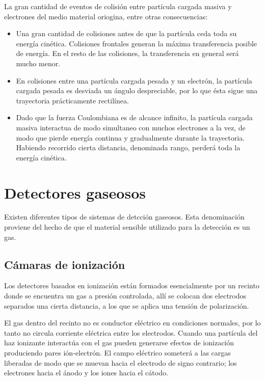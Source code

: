 %
La gran cantidad de eventos de colisi\'on entre part\'icula cargada masiva y electrones del medio material oriogina, entre otras 
consecuencias:

\begin{itemize}
 \item Una gran cantidad de colisiones antes de que la part\'icula ceda toda su energ\'ia cin\'etica. Colisiones frontales generan la 
 m\'axima transferencia posible de energ\'ia. En el resto de las colisiones, la transferencia en general ser\'a mucho menor.
 \item En colisiones entre una part\'icula cargada pesada y un electr\'on, la part\'icula cargada pesada es desviada un \'angulo 
 despreciable, por lo que \'esta sigue una trayectoria pr\'acticamente rectil\'inea.
 \item Dado que la fuerza Coulombiana es de alcance infinito, la part\'icula cargada masiva interactua de modo simultaneo con muchos 
 electrones a la vez, de modo que pierde energ\'ia continua y gradualmente durante la trayectoria. Habiendo recorrido cierta distancia, 
 denominada rango, perder\'a toda la energ\'ia cin\'etica.
\end{itemize}

\section{Detectores gaseosos}
\label{CapIII_5}


Existen diferentes tipos de sistemas de detcci\'on gaseosos. Esta denominaci\'on proviene del hecho de que el material sensible utilizado 
para la detecci\'on es un gas.


\subsection{C\'amaras de ionizaci\'on}
\label{CapIII_6}

Los detectores basados en ionizaci\'on est\'an formados esencialmente por un recinto donde se encuentra un gas a presi\'on controlada, all\'i se colocan dos 
electrodos separados una cierta distancia, a los que se aplica una tensi\'on de polarizaci\'on.

El gas dentro del recinto no es conductor el\'ectrico en condiciones normales, por lo tanto no circula corriente el\'ectrica entre los electrodos. Cuando una
part\'icula del haz ionizante interact\'ua con el gas pueden generarse efectos de ionizaci\'on produciendo pares i\'on-electr\'on. El campo el\'ectrico 
someter\'a a las cargas liberadas de modo que se muevan hacia el electrodo de signo contrario; los electrones hacia el \'anodo y los iones hacia el c\'atodo.

